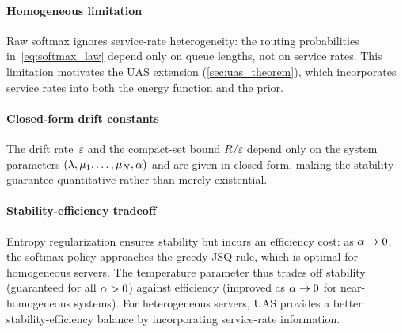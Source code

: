 \paragraph{Homogeneous limitation}
Raw softmax ignores service-rate heterogeneity: the routing probabilities in~\eqref{eq:softmax_law} depend only on queue lengths, not on service rates. This limitation motivates the UAS extension (\cref{sec:uas_theorem}), which incorporates service rates into both the energy function and the prior.

\paragraph{Closed-form drift constants}
The drift rate~$\varepsilon$ and the compact-set bound $R/\varepsilon$ depend only on the system parameters $(\lambda, \mu_1, \dots, \mu_N, \alpha)$ and are given in closed form, making the stability guarantee quantitative rather than merely existential.

\paragraph{Stability-efficiency tradeoff}
Entropy regularization ensures stability but incurs an efficiency cost: as $\alpha \to 0$, the softmax policy approaches the greedy JSQ rule, which is optimal for homogeneous servers. The temperature parameter thus trades off stability (guaranteed for all $\alpha > 0$) against efficiency (improved as $\alpha \to 0$ for near-homogeneous systems). For heterogeneous servers, UAS provides a better stability-efficiency balance by incorporating service-rate information.
